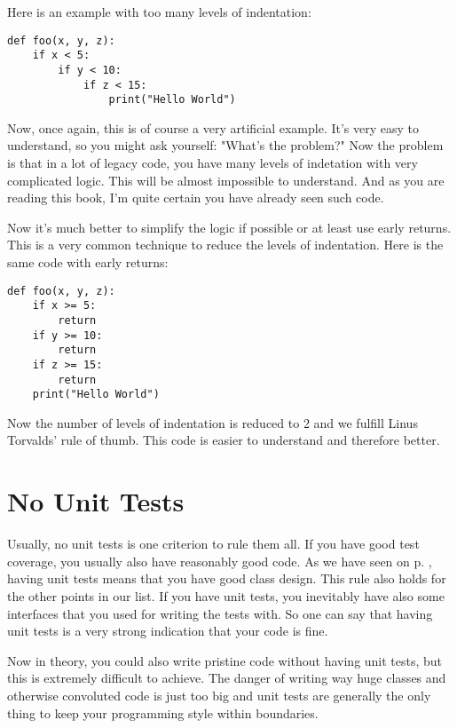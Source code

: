 Here is an example with too many levels of indentation:

\begin{programcode}{}
\begin{verbatim}
def foo(x, y, z):
    if x < 5:
        if y < 10:
            if z < 15:
                print("Hello World")
\end{verbatim}
\end{programcode}

Now, once again, this is of course a very artificial example. It's very easy to understand, so you might ask yourself: "What's the problem?" Now the problem is that in a lot of legacy code, you have many levels of indetation with very complicated logic. This will be almost impossible to understand. And as you are reading this book, I'm quite certain you have already seen such code.

Now it's much better to simplify the logic if possible or at least use early returns. This is a very common technique to reduce the levels of indentation. Here is the same code with early returns:

\begin{programcode}{}
\begin{verbatim}
def foo(x, y, z):
    if x >= 5:
        return
    if y >= 10:
        return
    if z >= 15:
        return
    print("Hello World")
\end{verbatim}
\end{programcode}

Now the number of levels of indentation is reduced to 2 and we fulfill Linus Torvalds' rule of thumb. This code is easier to understand and therefore better.

\section{No Unit Tests}

Usually, no unit tests is one criterion to rule them all. If you have good test coverage, you usually also have reasonably good code. As we have seen on p. \pageref{chap:unittests}, having unit tests means that you have good class design. This rule also holds for the other points in our list. If you have unit tests, you inevitably have also some interfaces that you used for writing the tests with. So one can say that having unit tests is a very strong indication that your code is fine.

Now in theory, you could also write pristine code without having unit tests, but this is extremely difficult to achieve. The danger of writing way huge classes and otherwise convoluted code is just too big and unit tests are generally the only thing to keep your programming style within boundaries.

